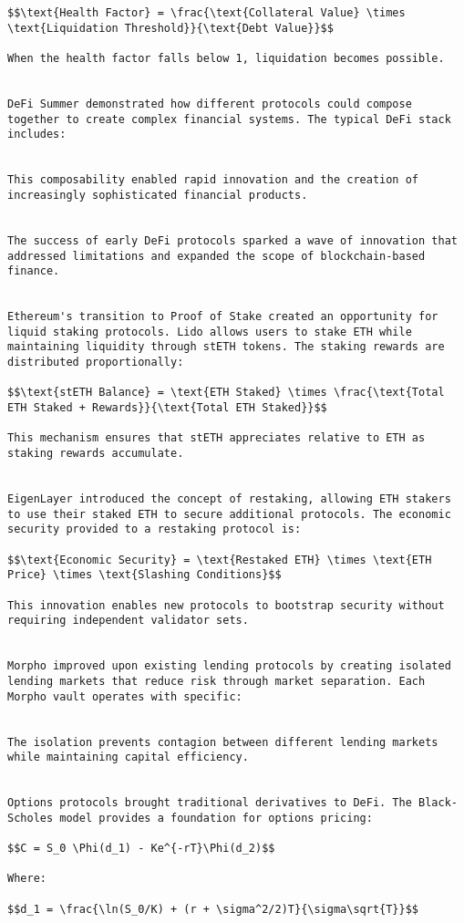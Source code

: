 \documentclass[12pt]{article}
\begin{document}
{{{\begin{itemize}
\begin{lstlisting}
$$\text{Health Factor} = \frac{\text{Collateral Value} \times \text{Liquidation Threshold}}{\text{Debt Value}}$$

When the health factor falls below 1, liquidation becomes possible.


DeFi Summer demonstrated how different protocols could compose together to create complex financial systems. The typical DeFi stack includes:


This composability enabled rapid innovation and the creation of increasingly sophisticated financial products.


The success of early DeFi protocols sparked a wave of innovation that addressed limitations and expanded the scope of blockchain-based finance.


Ethereum's transition to Proof of Stake created an opportunity for liquid staking protocols. Lido allows users to stake ETH while maintaining liquidity through stETH tokens. The staking rewards are distributed proportionally:

$$\text{stETH Balance} = \text{ETH Staked} \times \frac{\text{Total ETH Staked + Rewards}}{\text{Total ETH Staked}}$$

This mechanism ensures that stETH appreciates relative to ETH as staking rewards accumulate.


EigenLayer introduced the concept of restaking, allowing ETH stakers to use their staked ETH to secure additional protocols. The economic security provided to a restaking protocol is:

$$\text{Economic Security} = \text{Restaked ETH} \times \text{ETH Price} \times \text{Slashing Conditions}$$

This innovation enables new protocols to bootstrap security without requiring independent validator sets.


Morpho improved upon existing lending protocols by creating isolated lending markets that reduce risk through market separation. Each Morpho vault operates with specific:


The isolation prevents contagion between different lending markets while maintaining capital efficiency.


Options protocols brought traditional derivatives to DeFi. The Black-Scholes model provides a foundation for options pricing:

$$C = S_0 \Phi(d_1) - Ke^{-rT}\Phi(d_2)$$

Where:

$$d_1 = \frac{\ln(S_0/K) + (r + \sigma^2/2)T}{\sigma\sqrt{T}}$$


\end{lstlisting}
\end{itemize}}}}
\end{document}
